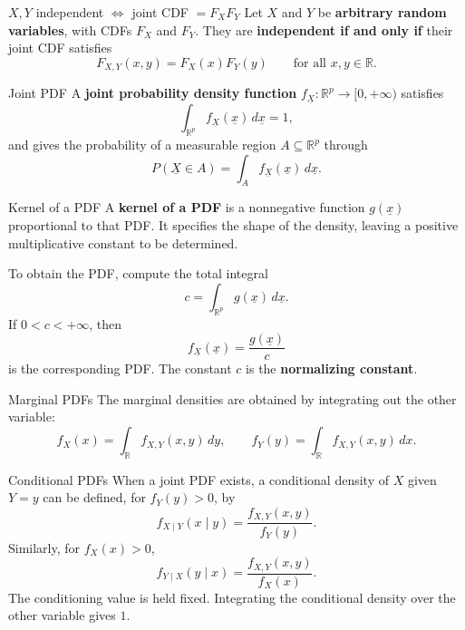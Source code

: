 \documentclass[12pt,a4paper,oneside]{report}
\begin{document}
\begin{framedprop}{$X,Y$ independent $\Longleftrightarrow$ joint CDF $=F_XF_Y$}
\label{prop:independence-cdf}
Let $X$ and $Y$ be \textbf{arbitrary random variables}, with
CDFs $F_X$ and $F_Y$. They are \textbf{independent if and only if}
their joint CDF satisfies
\[
  F_{X,Y}(x,y)=F_X(x)F_Y(y)
  \qquad\text{for all }x,y\in\mathbb R.
\]
\end{framedprop}

\begin{frameddefn}{Joint PDF}
\label{def:joint-pdf}
A \textbf{joint probability density function}
$f_{\underline{X}}:\mathbb R^p\to[0,+\infty)$ satisfies
\[
  \int_{\mathbb R^p}f_{\underline{X}}(\underline{x})\,d\underline{x}=1,
\]
and gives the probability of a measurable region
$A\subseteq\mathbb R^p$ through
\[
  P(\underline{X}\in A)=\int_A f_{\underline{X}}(\underline{x})\,d\underline{x}.
\]
\end{frameddefn}

\begin{frameddefn}{Kernel of a PDF}
\label{def:pdf-kernel}
A \textbf{kernel of a PDF} is a nonnegative function
$g(\underline{x})$ proportional to that PDF. It specifies the
shape of the density, leaving a positive multiplicative constant
to be determined.

To obtain the PDF, compute the total integral
\[
  c=\int_{\mathbb R^p}g(\underline{x})\,d\underline{x}.
\]
If $0<c<+\infty$, then
\[
  f_{\underline{X}}(\underline{x})=\frac{g(\underline{x})}{c}
\]
is the corresponding PDF. The constant $c$ is the
\textbf{normalizing constant}.
\end{frameddefn}

\begin{framedprop}{Marginal PDFs}
\label{prop:marginal-pdfs}
The marginal densities are obtained by integrating out the
other variable:
\[
  f_X(x)=\int_{\mathbb R}f_{X,Y}(x,y)\,dy,
  \qquad
  f_Y(y)=\int_{\mathbb R}f_{X,Y}(x,y)\,dx.
\]
\end{framedprop}

\begin{frameddefn}{Conditional PDFs}
When a joint PDF exists, a conditional density of $X$ given $Y=y$
can be defined, for $f_Y(y)>0$, by
\[
  f_{X\mid Y}(x\mid y)=\frac{f_{X,Y}(x,y)}{f_Y(y)}.
\]
Similarly, for $f_X(x)>0$,
\[
  f_{Y\mid X}(y\mid x)=\frac{f_{X,Y}(x,y)}{f_X(x)}.
\]
The conditioning value is held fixed. Integrating the conditional
density over the other variable gives $1$.
\end{frameddefn}
\end{document}
